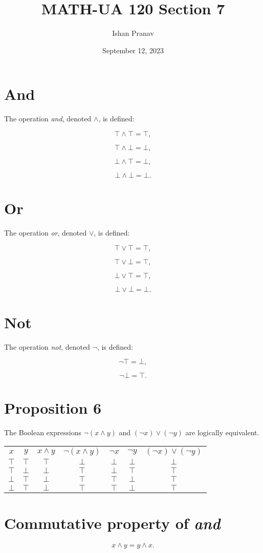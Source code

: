 \documentclass[12pt]{article}
\title{MATH-UA 120 Section 7}
\author{Ishan Pranav}
\date{September 12, 2023}
\begin{document}
\maketitle
\section*{And}
The operation \textit{and}, denoted $\land$, is defined:

\[\top\land\top=\top,\]

\[\top\land\bot=\bot,\]

\[\bot\land\top=\bot,\]

\[\bot\land\bot=\bot.\]
\section*{Or}
The operation \textit{or}, denoted $\lor$, is defined:

\[\top\lor\top=\top,\]

\[\top\lor\bot=\top,\]

\[\bot\lor\top=\top,\]

\[\bot\lor\bot=\bot.\]
\section*{Not}
The operation \textit{not}, denoted $\lnot$, is defined:

\[\lnot\top=\bot,\]

\[\lnot\bot=\top.\]
\section*{Proposition 6}
The Boolean expressions $\lnot(x\land y)$ and $(\lnot x)\lor(\lnot y)$ are logically equivalent.

\begin{center}
\begin{tabular}{c|c||c|c||c|c|c}
$x$&$y$&$x\land y$&$\lnot(x\land y)$&$\lnot x$&$\lnot y$&$(\lnot x)\lor(\lnot y)$\\
$\top$&$\top$&$\top$&$\bot$&$\bot$&$\bot$&$\bot$\\
$\top$&$\bot$&$\bot$&$\top$&$\bot$&$\top$&$\top$\\
$\bot$&$\top$&$\bot$&$\top$&$\top$&$\bot$&$\top$\\
$\bot$&$\top$&$\bot$&$\top$&$\top$&$\bot$&$\top$
\end{tabular}
\end{center}
\section*{Commutative property of \textit{and}}
\[x\land y=y\land x.\]
\end{document}
